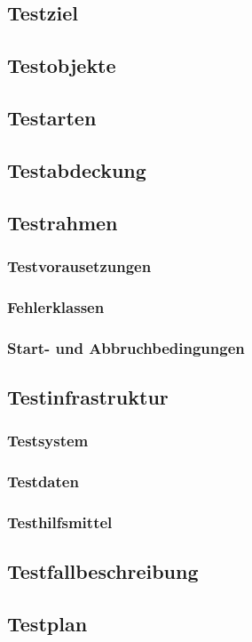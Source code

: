 \subsection{Testziel}
\subsection{Testobjekte}
\subsection{Testarten}
\subsection{Testabdeckung}
\subsection{Testrahmen}
\subsubsection{Testvorausetzungen}
\subsubsection{Fehlerklassen}
\subsubsection{Start- und Abbruchbedingungen}
\subsection{Testinfrastruktur}
\subsubsection{Testsystem}
\subsubsection{Testdaten}
\subsubsection{Testhilfsmittel}
\subsection{Testfallbeschreibung}
\subsection{Testplan}